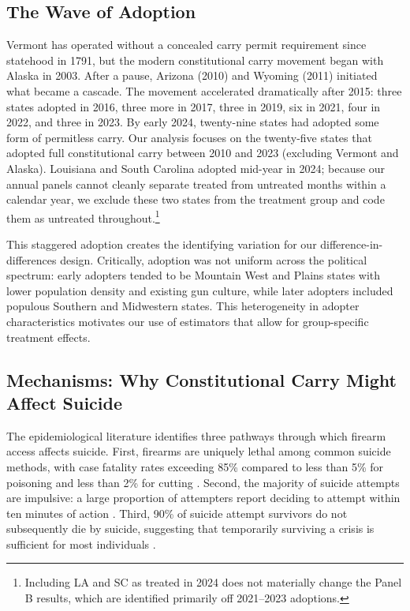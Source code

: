 \documentclass[12pt]{article}
\begin{document}
\subsection{The Wave of Adoption}

Vermont has operated without a concealed carry permit requirement since statehood in 1791, but the modern constitutional carry movement began with Alaska in 2003. After a pause, Arizona (2010) and Wyoming (2011) initiated what became a cascade. The movement accelerated dramatically after 2015: three states adopted in 2016, three more in 2017, three in 2019, six in 2021, four in 2022, and three in 2023. By early 2024, twenty-nine states had adopted some form of permitless carry. Our analysis focuses on the twenty-five states that adopted full constitutional carry between 2010 and 2023 (excluding Vermont and Alaska). Louisiana and South Carolina adopted mid-year in 2024; because our annual panels cannot cleanly separate treated from untreated months within a calendar year, we exclude these two states from the treatment group and code them as untreated throughout.\footnote{Including LA and SC as treated in 2024 does not materially change the Panel B results, which are identified primarily off 2021--2023 adoptions.}

This staggered adoption creates the identifying variation for our difference-in-differences design. Critically, adoption was not uniform across the political spectrum: early adopters tended to be Mountain West and Plains states with lower population density and existing gun culture, while later adopters included populous Southern and Midwestern states. This heterogeneity in adopter characteristics motivates our use of estimators that allow for group-specific treatment effects.

\subsection{Mechanisms: Why Constitutional Carry Might Affect Suicide}

The epidemiological literature identifies three pathways through which firearm access affects suicide. First, firearms are uniquely lethal among common suicide methods, with case fatality rates exceeding 85\% compared to less than 5\% for poisoning and less than 2\% for cutting \citep{miller2012firearms}. Second, the majority of suicide attempts are impulsive: a large proportion of attempters report deciding to attempt within ten minutes of action \citep{simon2001characteristics}. Third, 90\% of suicide attempt survivors do not subsequently die by suicide, suggesting that temporarily surviving a crisis is sufficient for most individuals \citep{owens2002fatal}.
\end{document}
